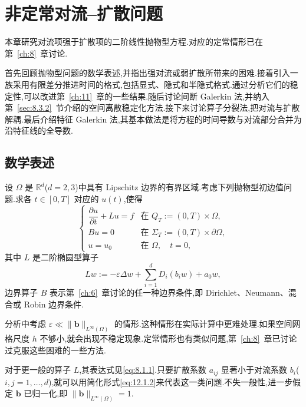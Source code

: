 \chapter{非定常对流--扩散问题}\label{ch:12}

本章研究对流项强于扩散项的二阶线性抛物型方程.对应的定常情形已在第~\ref{ch:8}~章讨论.

首先回顾抛物型问题的数学表述,并指出强对流或弱扩散所带来的困难.接着引入一族采用有限差分推进时间的格式,包括显式、隐式和半隐式格式.通过分析它们的稳定性,可以改进第~\ref{ch:11}~章的一些结果.随后讨论间断 Galerkin 法,并纳入第~\ref{sec:8.3.2}~节介绍的空间离散稳定化方法.接下来讨论算子分裂法,把对流与扩散解耦.最后介绍特征 Galerkin 法,其基本做法是将方程的时间导数与对流部分合并为沿特征线的全导数.

\section{数学表述}\label{sec:12.1}

设 \(\Omega\) 是 \(\mathbb R^d\)(\(d=2,3\))中具有 Lipschitz 边界的有界区域.考虑下列抛物型初边值问题.求各 \(t\in[0,T]\) 对应的 \(u(t)\),使得
\begin{equation}\label{eq:12.1.1}
  \begin{cases}
    \dfrac{\partial u}{\partial t}+Lu=f & \text{在 } Q_T:=(0,T)\times\Omega,\\[2pt]
    Bu=0 & \text{在 } \Sigma_T:=(0,T)\times\partial\Omega,\\
    u=u_0 & \text{在 } \Omega,\quad t=0,
  \end{cases}
\end{equation}
其中 \(L\) 是二阶椭圆型算子
\begin{equation}\label{eq:12.1.2}
  Lw:=-\varepsilon\Delta w+\sum_{i=1}^d D_i(b_iw)+a_0w,
\end{equation}
边界算子 \(B\) 表示第~\ref{ch:6}~章讨论的任一种边界条件,即 Dirichlet、Neumann、混合或 Robin 边界条件.

分析中考虑 \(\varepsilon\ll\|\boldsymbol{b}\|_{L^\infty(\Omega)}\) 的情形.这种情形在实际计算中更难处理.如果空间网格尺度 \(h\) 不够小,就会出现不稳定现象.定常情形也有类似问题,第~\ref{ch:8}~章已讨论过克服这些困难的一些方法.

对于更一般的算子 \(L\),其表达式见\eqref{eq:8.1.1}.只要扩散系数 \(a_{ij}\) 显著小于对流系数 \(b_i\)(\(i,j=1,\ldots,d\)),就可以用简化形式\eqref{eq:12.1.2}来代表这一类问题.不失一般性,进一步假定 \(\boldsymbol{b}\) 已归一化,即 \(\|\boldsymbol{b}\|_{L^\infty(\Omega)}=1\).

